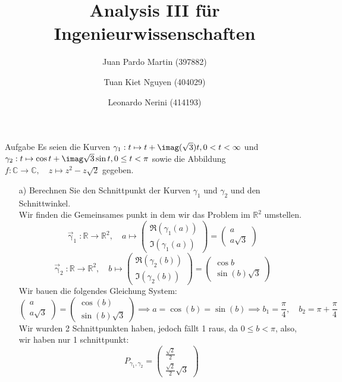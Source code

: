 \documentclass{scrartcl}
\title{Analysis III für Ingenieurwissenschaften}
\author{Juan Pardo Martin (397882)\and Tuan Kiet Nguyen (404029)\and Leonardo Nerini (414193)}
\def\mbb#1{\mathbb{#1}}
\def\bC{\mbb{C}}
\def\bR{\mbb{R}}
\newcommand{\func}[3]{#1\colon#2\to#3}
\newcommand{\vfunc}[5]{\func{#1}{#2}{#3},\quad#4\longmapsto#5}
\begin{document}
\maketitle
\begin{section}{Aufgabe}%
Es seien die Kurven \(\gamma_1 : t \mapsto t + \imag(\sqrt 3)t, 0 < t < \infty\) 
und 
\(\gamma_2 : t \mapsto \cos t + \imag\sqrt 3 \sin t, 0 \leq t < \pi\)
sowie die Abbildung \(\vfunc{f}{\bC}{\bC}{z}{z^2-z\sqrt 2}\)
 gegeben.
\begin{itemize}
\item[a)]
Berechnen Sie den Schnittpunkt der Kurven $\gamma_1$ und $\gamma_2$ und den Schnittwinkel.\\
Wir finden die Gemeinsames punkt in dem wir das Problem im $\bR^2$ umstellen.
\[\vfunc{\vec{\upgamma}_1}{\bR}{\bR^2}{a}{\begin{pmatrix}\Re(\gamma_1(a))\\\Im(\gamma_1(a))\end{pmatrix}
=\begin{pmatrix}a\\a\sqrt{3}\end{pmatrix}}\]
\[\vfunc{\vec{\upgamma}_2}{\bR}{\bR^2}{b}{\begin{pmatrix}\Re(\gamma_2(b))\\\Im(\gamma_2(b))\end{pmatrix}
=\begin{pmatrix}\cos b\\\sin(b)\sqrt{3}\end{pmatrix}}\]
Wir bauen die folgendes Gleichung System:
\[\begin{pmatrix}a\\a\sqrt{3}\end{pmatrix}=\begin{pmatrix}\cos(b)\\\sin(b)\sqrt{3}\end{pmatrix}
\implies a=\cos(b)=\sin(b)\implies b_1=\frac{\pi}{4},\quad b_2=\pi+\frac{\pi}{4}\]
Wir wurden 2 Schnittpunkten haben, jedoch fällt 1 raus, da $0 \leq b < \pi$, also, wir haben nur 1 schnittpunkt:
\newcommand{\schnt}[3]{#3_{#1,#2}}
\[\schnt{\gamma_1}{\gamma_2}{P}=\begin{pmatrix}\frac{\sqrt{2}}{2}\\\frac{\sqrt{2}}{2} \sqrt{3}\end{pmatrix}%
\]
\end{itemize}
\end{section}
\end{document}
